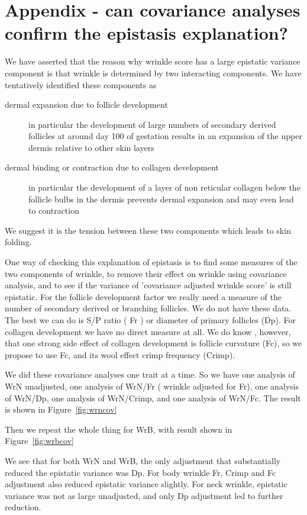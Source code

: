 \documentclass[titlepage]{article}  %
\begin{document}
\appendix
\section{Appendix - can covariance analyses confirm the epistasis explanation?}
We have asserted that the reason why wrinkle score has a large epistatic variance component is that wrinkle is determined by two interacting components. We have tentatively identified these components as
\begin{description}
\item[dermal expansion due to follicle development] in particular the development of large numbers of secondary derived follicles at around day 100 of gestation results in an expansion of the upper dermis relative to other skin layers
\item[dermal binding or contraction due to collagen development] in particular  the development of a layer of non reticular collagen below the follicle bulbs in the dermis prevents dermal expansion and may even lead to contraction
\end{description}
We suggest it is the tension between these two components which leads to skin folding.

One way of checking  this explanation of epistasis is to find some measures of the two components of wrinkle, to remove their effect on wrinkle using covariance analysis, and to see if the variance of 'covariance adjusted wrinkle score'  is still epistatic. For the follicle development factor we really need a measure of the number of secondary derived or branching follicles. We do not have these data. The best we can do is S/P ratio ( Fr ) or diameter of primary follicles (Dp). For collagen development we have no direct measure at all. We do know , however, that one strong side effect of collagen development is follicle curvature (Fc), so we propose to use Fc, and its wool effect crimp frequency (Crimp).

We did these covariance analyses one trait at a time. So we have one analysis of WrN unadjusted, one analysis of WrN/Fr ( wrinkle adjusted for Fr), one analysis of WrN/Dp, one analysis of WrN/Crimp, and one analysis of WrN/Fc. The result is shown in Figure~\ref{fig:wrncov}

Then we repeat the whole thing for WrB, with result shown in Figure~\ref{fig:wrbcov}

We see that for both WrN and WrB, the only adjustment that substantially reduced the epistatic variance was Dp. For body wrinkle Fr, Crimp and Fc adjustment also reduced epistatic variance slightly. For neck wrinkle, epistatic variance was not as large unadjusted, and only Dp adjustment led to further  reduction.
\end{document}
